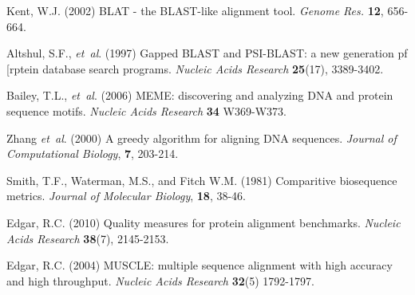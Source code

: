 \documentclass[phd,tocprelim]{cornell}
\begin{document}
\begin{thebibliography}{}
Kent, W.J. (2002) BLAT - the BLAST-like alignment tool. \textit{Genome Res.} \textbf{12}, 656-664.

Altshul, S.F., \textit{et~al}. (1997) Gapped BLAST and PSI-BLAST: a new generation pf [rptein database search programs. \textit{Nucleic Acids Research} \textbf{25}(17), 3389-3402.

Bailey, T.L., \textit{et~al}. (2006) MEME: discovering and analyzing DNA and protein sequence motifs. \textit{Nucleic Acids Research} \textbf{34} W369-W373.

Zhang \textit{et~al}. (2000) A greedy algorithm for aligning DNA sequences. \textit{Journal of Computational Biology}, \textbf{7}, 203-214.

Smith, T.F., Waterman, M.S., and Fitch W.M. (1981) Comparitive biosequence metrics. \textit{Journal of Molecular Biology}, \textbf{18}, 38-46.

Edgar, R.C. (2010) Quality measures for protein alignment benchmarks. \textit{Nucleic Acids Research} \textbf{38}(7), 2145-2153.

Edgar, R.C. (2004) MUSCLE: multiple sequence alignment with high accuracy and high throughput. \textit{Nucleic Acids Research} \textbf{32}(5) 1792-1797.

\end{thebibliography}
\end{document}
